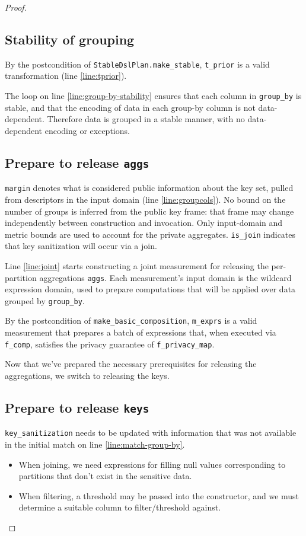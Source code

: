 \documentclass{article}
\begin{document}
\begin{proof}
\subsection{Stability of grouping}
By the postcondition of \texttt{StableDslPlan.make\_stable}, \texttt{t\_prior} is a valid transformation (line \ref{line:tprior}).

The loop on line \ref{line:group-by-stability} ensures that each column in \texttt{group\_by} is stable,
and that the encoding of data in each group-by column is not data-dependent.
Therefore data is grouped in a stable manner, with no data-dependent encoding or exceptions.

\subsection{Prepare to release \texttt{aggs}}
\texttt{margin} denotes what is considered public information about the key set,
pulled from descriptors in the input domain (line \ref{line:groupcols}).
No bound on the number of groups is inferred from the public key frame: that frame may
change independently between construction and invocation. Only input-domain and metric
bounds are used to account for the private aggregates.
\texttt{is\_join} indicates that key sanitization will occur via a join.

Line \ref{line:joint} starts constructing a joint measurement
for releasing the per-partition aggregations \texttt{aggs}.
Each measurement's input domain is the wildcard expression domain,
used to prepare computations that will be applied over data grouped by \texttt{group\_by}.

By the postcondition of \texttt{make\_basic\_composition},
\texttt{m\_exprs} is a valid measurement that prepares a batch of expressions that,
when executed via \texttt{f\_comp}, satisfies the privacy guarantee of \texttt{f\_privacy\_map}.

Now that we've prepared the necessary prerequisites for releasing the aggregations,
we switch to releasing the keys.

\subsection{Prepare to release \texttt{keys}}
\texttt{key\_sanitization} needs to be updated with information that was not available in the initial match on line \ref{line:match-group-by}.
\begin{itemize}
    \item When joining, we need expressions for filling null values corresponding to partitions that don't exist in the sensitive data.
    \item When filtering, a threshold may be passed into the constructor, and we must determine a suitable column to filter/threshold against.
\end{itemize}


\end{proof}
\end{document}
